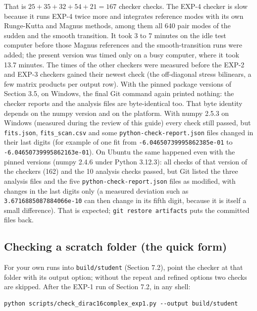 \documentclass[11pt]{article}
\begin{document}
That is $25+35+32+54+21=167$ checker checks. The EXP-4 checker is slow because it runs EXP-4 twice more and integrates reference modes with its own Runge-Kutta and Magnus methods, among them all 640 pair modes of the sudden and the smooth transition. It took 3 to 7 minutes on the idle test computer before those Magnus references and the smooth-transition runs were added; the present version was timed only on a busy computer, where it took 13.7 minutes. The times of the other checkers were measured before the EXP-2 and EXP-3 checkers gained their newest check (the off-diagonal stress bilinears, a few matrix products per output row). With the pinned package versions of Section 3.5, on Windows, the final Git command again printed nothing: the checker reports and the analysis files are byte-identical too. That byte identity depends on the numpy version and on the platform. With numpy 2.5.3 on Windows (measured during the review of this guide) every check still passed, but \texttt{fits.jso\allowbreak{}n}, \texttt{fits\_sca\allowbreak{}n.csv} and some \texttt{python-c\allowbreak{}heck-rep\allowbreak{}ort.json} files changed in their last digits (for example \texttt{} of one fit from \texttt{-6.04650\allowbreak{}73999586\allowbreak{}2385e-01} to \texttt{-6.04650\allowbreak{}73999586\allowbreak{}2163e-01}). On Ubuntu the same happened even with the pinned versions (numpy 2.4.6 under Python 3.12.3): all checks of that version of the checkers (162) and the 10 analysis checks passed, but Git listed the three analysis files and the five \texttt{python-c\allowbreak{}heck-rep\allowbreak{}ort.json} files as modified, with changes in the last digits only (a measured deviation such as \texttt{3.671688\allowbreak{}50878840\allowbreak{}66e-10} can then change in its fifth digit, because it is itself a small difference). That is expected; \texttt{git rest\allowbreak{}ore arti\allowbreak{}facts} puts the committed files back.

\subsection{Checking a scratch folder (the quick form)}

For your own runs into \texttt{build/st\allowbreak{}udent} (Section 7.2), point the checker at that folder with its output option; without the repeat and refined options two checks are skipped. After the EXP-1 run of Section 7.2, in any shell:

\begin{Verbatim}[fontsize=\small]
python scripts/check_dirac16complex_exp1.py --output build/student
\end{Verbatim}
\end{document}
